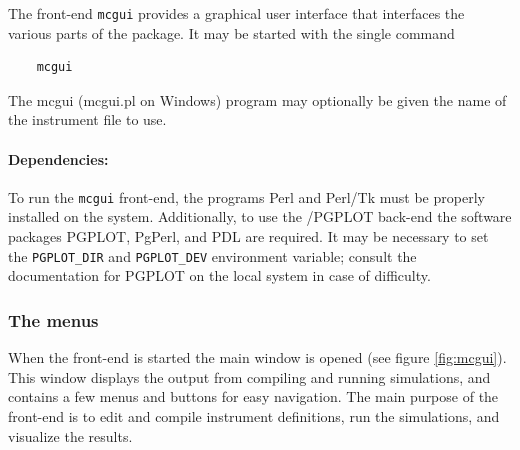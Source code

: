 The front-end \verb+mcgui+ provides a graphical user interface that interfaces
the various parts of the \MCS package. It may be started with the single
command
\begin{lstlisting}
    mcgui
\end{lstlisting}
The mcgui (mcgui.pl on Windows) program may optionally be given the name of the
instrument file to use.

\paragraph{Dependencies:}
 To run the \verb+mcgui+
front-end, the programs Perl and Perl/Tk must be properly installed on the
system. Additionally, to use the \MCS/PGPLOT back-end the software packages
PGPLOT, PgPerl, and PDL are required.
 It may be
necessary to set the \verb+PGPLOT_DIR+ and \verb+PGPLOT_DEV+ environment
variable; consult the documentation for PGPLOT on the local system in case of
difficulty.

\subsubsection{The menus}

When the front-end is started the main window is opened (see figure
\ref{fig:mcgui}). This window displays the output from compiling and running
simulations, and contains a few menus and buttons for easy navigation. The main
purpose of the front-end is to edit and compile instrument definitions, run the
simulations, and visualize the results.

